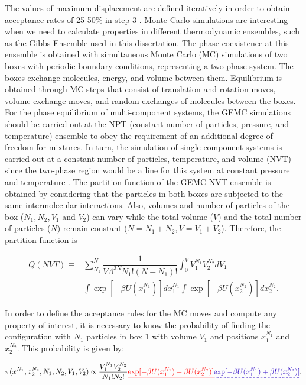 \documentclass[
	12pt,				%
	openany,			%
	oneside,			%
	a4paper,			%
	english,			%
	brazil				%
	]{abntex2}
\providecommand{\DIFadd}[1]{{\protect\color{blue}\uwave{#1}}}
\providecommand{\DIFdel}[1]{{\protect\color{red}\sout{#1}}}
\providecommand{\DIFaddbegin}{}
\providecommand{\DIFaddend}{}
\providecommand{\DIFdelbegin}{}
\providecommand{\DIFdelend}{}
\providecommand{\DIFadd}[1]{{\protect\color{blue}\uwave{#1}}} %
\providecommand{\DIFdel}[1]{{\protect\color{red}\sout{#1}}}                      %
\providecommand{\DIFaddbegin}{} %
\providecommand{\DIFaddend}{} %
\providecommand{\DIFdelbegin}{} %
\providecommand{\DIFdelend}{} %
\begin{document}
The values of maximum displacement are defined iteratively in order to obtain acceptance rates of 25-50\% in step 3   \cite{Frenkel2013}. Monte Carlo simulations are interesting when we need to calculate properties in different thermodynamic ensembles, such as the Gibbs Ensemble used in this dissertation. The phase coexistence at this ensemble is obtained with simultaneous Monte Carlo (MC) simulations of two boxes with periodic boundary conditions, representing a two-phase system. The boxes exchange molecules, energy, and volume between them. Equilibrium is obtained through MC steps that consist of translation and rotation moves, volume exchange moves, and random exchanges of molecules between the boxes. For the phase equilibrium of multi-component systems, the GEMC simulations should be carried out at the NPT (constant number of particles, pressure, and temperature) ensemble to obey the requirement of an additional degree of freedom for mixtures. In turn, the simulation of single component systems is carried out at a constant number of particles, temperature, and volume (NVT) since the two-phase region would be a line for this system at constant pressure and temperature \cite{frenkel}. The partition function of the GEMC-NVT ensemble is obtained by considering that the particles in both boxes are subjected to the same intermolecular interactions. Also, volumes and number of particles of the box ($N_{1}$,$\, N_{2}$,$\, V_{1}$ and $V_{2}$) can vary while the total volume ($V$) and the total number of particles ($N$) remain constant ($N = N_{1} + N_{2}$,$\, V = V_{1} + V_{2}$). Therefore, the partition function is

\begin{equation}
\begin{aligned}
Q(NVT) {} \equiv & \sum_{N_{1}}^{N} \dfrac{1}{V \Lambda ^{3N} N_{1}!(N-N_{1})!} \int_{0}^{V} V_{1}^{N_{1}} V_{2}^{N_{2}} dV_{1} \\
& \int  \exp[-\beta U(x_{1}^{N_{1}})] dx_{1}^{N_{1}} \int  \exp[-\beta U(x_{2}^{N_{2}})] dx_{2}^{N_{2}}.
\end{aligned}
\label{eqn:gepart}
\end{equation}

In order to define the acceptance rules for the MC moves and compute any property of interest, it is necessary to know the probability of finding the configuration with $N_{1}$ particles in box 1 with volume $V_{1}$ and positions $x_{1}^{N_{1}}$ and $x_{2}^{N_{2}}$. This probability is given by:

\begin{equation}
\pi(x_{1}^{N_{1}},x_{2}^{N_{2}},N_{1},N_{2},V_{1},V_{2}) \propto \dfrac{V_{1}^{N_{1}}V_{2}^{N_{2}}}{N_{1}!N_{2}!} \DIFdelbegin \DIFdel{\exp[-\beta U(x_{1}^{N_{1}}) -\beta U(x_{2}^{N_{2}})] }\DIFdelend \DIFaddbegin \DIFadd{\exp[-\beta U(x_{1}^{N_{1}}) +\beta U(x_{2}^{N_{2}})] }\DIFaddend .
\label{eqn:geprob}
\end{equation}
\end{document}
